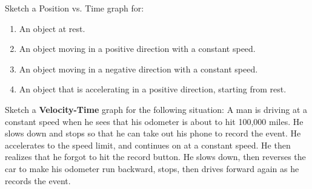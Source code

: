 \documentclass[11pt]{examdesign}
\begin{document}
\pagebreak
\begin{shortanswer}[title={Free Response},
	rearrange=no]

\begin{question}
Sketch a Position vs. Time graph for:
\begin{enumerate}
	\item An object at rest.
	\vspace{0.75 in}
	\item An object moving in a positive direction with a constant speed.
	\vspace{0.75 in}
	\item An object moving in a negative direction with a constant speed.
	\vspace{0.75 in}
	\item An object that is accelerating in a positive direction, starting from rest.
	\vspace{0.75 in}
\end{enumerate}

\end{question}




\begin{question}

	Sketch a \textbf{Velocity-Time} graph for the following situation:
	A man is driving at a constant speed when he sees that his odometer is about to hit 100,000 miles.  He slows down and stops so that he can take out his phone to record the event.  He accelerates to the speed limit, and continues on at a constant speed.  He then realizes that he forgot to hit the record button. He slows down, then reverses the car to make his odometer run backward, stops, then drives forward again as he records the event.  
	
\end{question}

	\end{shortanswer}
\end{document}

